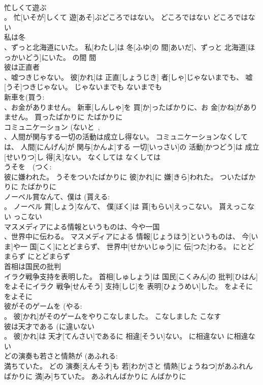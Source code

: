 \documentclass[8pt]{extreport}
\begin{document}
\begin{CJK}{UTF8}{min}
\\	忙しくて遊ぶ 
\\	。	忙[いそが]しくて 遊[あそ]ぶどころではない。	どころではない	どころではない	
\\	私は冬 
\\	、ずっと北海道にいた。	私[わたし]は 冬[ふゆ]の 間[あいだ]、ずっと 北海道[ほっかいどう]にいた。	の間	間	
\\	彼は正直者 
\\	、嘘つきじゃない。	彼[かれ]は 正直[しょうじき] 者[しゃ]じゃないまでも、 嘘[うそ]つきじゃない。	じゃないまでも	ないまでも	
\\	新車を(買う: 
\\	、お金がありません。	新車[しんしゃ]を 買[か]ったばかりに、お 金[かね]がありません。	買ったばかりに	たばかりに	
\\	コミュニケーション (ないと~, 
\\	、人間が関与する一切の活動は成立し得ない。	コミュニケーションなくしては、 人間[にんげん]が 関与[かんよ]する 一切[いっさい]の 活動[かつどう]は 成立[せいりつ]し 得[え]ない。	なくしては	なくしては	
\\	うそを　(つく: 
\\	彼に嫌われた。	うそをついたばかりに 彼[かれ]に 嫌[きら]われた。	ついたばかりに	たばかりに	
\\	ノーベル賞なんて、僕は (貰える: 
\\	。	ノーベル 賞[しょう]なんて、 僕[ぼく]は 貰[もらい]えっこない。	貰えっこない	っこない	
\\	マスメディアによる情報というものは、今や一国 
\\	、世界中に伝わる。	マスメディアによる 情報[じょうほう]というものは、 今[いま]や一 国[こく]にとどまらず、 世界中[せかいじゅう]に 伝[つた]わる。	にとどまらず	にとどまらず	
\\	首相は国民の批判 
\\	イラク戦争支持を表明した。	首相[しゅしょう]は 国民[こくみん]の 批判[ひはん]をよそにイラク 戦争[せんそう] 支持[しじ]を 表明[ひょうめい]した。	をよそに	をよそに	
\\	彼がそのゲームを (やる: 
\\	。	彼[かれ]がそのゲームをやりこなしました。	こなしました	こなす	
\\	彼は天才である (に違いない 
\\	。	彼[かれ]は 天才[てんさい]であるに 相違[そうい]ない。	に相違ない	に相違ない	
\\	どの演奏も若さと情熱が (あふれる: 
\\	満ちていた。	どの 演奏[えんそう]も 若[わか]さと 情熱[じょうねつ]があふれんばかりに 満[み]ちていた。	あふれんばかりに	んばかりに	

\end{CJK}
\end{document}
